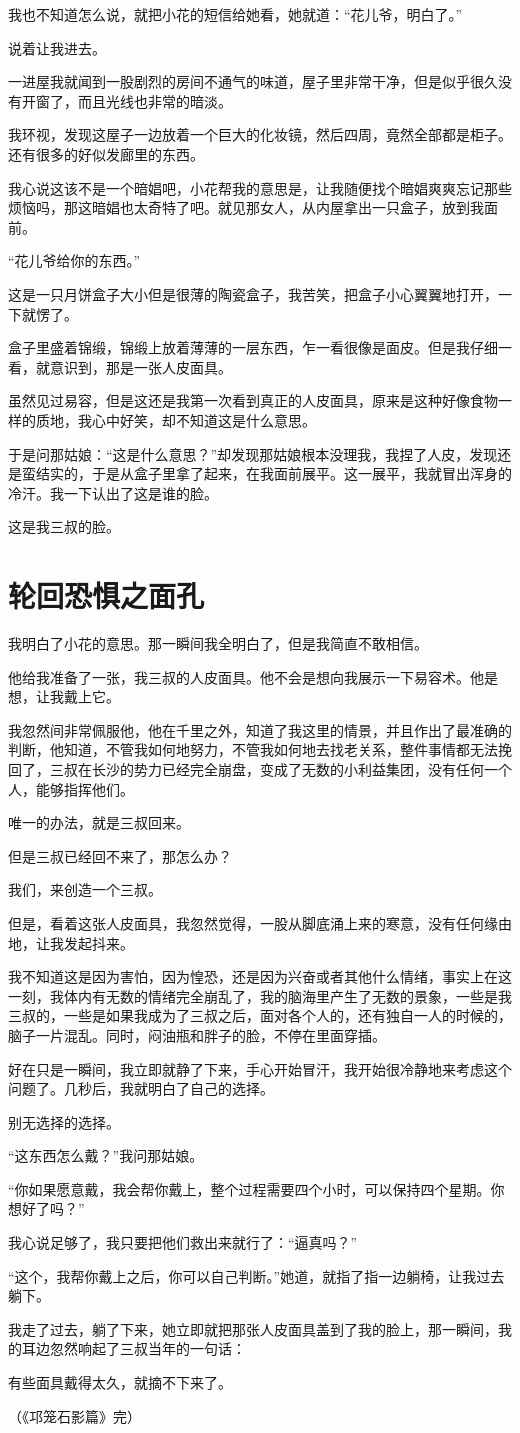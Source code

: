 我也不知道怎么说，就把小花的短信给她看，她就道：“花儿爷，明白了。”

说着让我进去。

一进屋我就闻到一股剧烈的房间不通气的味道，屋子里非常干净，但是似乎很久没有开窗了，而且光线也非常的暗淡。

我环视，发现这屋子一边放着一个巨大的化妆镜，然后四周，竟然全部都是柜子。还有很多的好似发廊里的东西。

我心说这该不是一个暗娼吧，小花帮我的意思是，让我随便找个暗娼爽爽忘记那些烦恼吗，那这暗娼也太奇特了吧。就见那女人，从内屋拿出一只盒子，放到我面前。

“花儿爷给你的东西。”

这是一只月饼盒子大小但是很薄的陶瓷盒子，我苦笑，把盒子小心翼翼地打开，一下就愣了。

盒子里盛着锦缎，锦缎上放着薄薄的一层东西，乍一看很像是面皮。但是我仔细一看，就意识到，那是一张人皮面具。

虽然见过易容，但是这还是我第一次看到真正的人皮面具，原来是这种好像食物一样的质地，我心中好笑，却不知道这是什么意思。

于是问那姑娘：“这是什么意思？”却发现那姑娘根本没理我，我捏了人皮，发现还是蛮结实的，于是从盒子里拿了起来，在我面前展平。这一展平，我就冒出浑身的冷汗。我一下认出了这是谁的脸。

这是我三叔的脸。

\chapter{轮回恐惧之面孔}

我明白了小花的意思。那一瞬间我全明白了，但是我简直不敢相信。

他给我准备了一张，我三叔的人皮面具。他不会是想向我展示一下易容术。他是想，让我戴上它。

我忽然间非常佩服他，他在千里之外，知道了我这里的情景，并且作出了最准确的判断，他知道，不管我如何地努力，不管我如何地去找老关系，整件事情都无法挽回了，三叔在长沙的势力已经完全崩盘，变成了无数的小利益集团，没有任何一个人，能够指挥他们。

唯一的办法，就是三叔回来。

但是三叔已经回不来了，那怎么办？

我们，来创造一个三叔。

但是，看着这张人皮面具，我忽然觉得，一股从脚底涌上来的寒意，没有任何缘由地，让我发起抖来。

我不知道这是因为害怕，因为惶恐，还是因为兴奋或者其他什么情绪，事实上在这一刻，我体内有无数的情绪完全崩乱了，我的脑海里产生了无数的景象，一些是我三叔的，一些是如果我成为了三叔之后，面对各个人的，还有独自一人的时候的，脑子一片混乱。同时，闷油瓶和胖子的脸，不停在里面穿插。

好在只是一瞬间，我立即就静了下来，手心开始冒汗，我开始很冷静地来考虑这个问题了。几秒后，我就明白了自己的选择。

别无选择的选择。

“这东西怎么戴？”我问那姑娘。

“你如果愿意戴，我会帮你戴上，整个过程需要四个小时，可以保持四个星期。你想好了吗？”

我心说足够了，我只要把他们救出来就行了：“逼真吗？”

“这个，我帮你戴上之后，你可以自己判断。”她道，就指了指一边躺椅，让我过去躺下。

我走了过去，躺了下来，她立即就把那张人皮面具盖到了我的脸上，那一瞬间，我的耳边忽然响起了三叔当年的一句话：

有些面具戴得太久，就摘不下来了。

{\fzqiti\hfill （《邛笼石影篇》完）}

